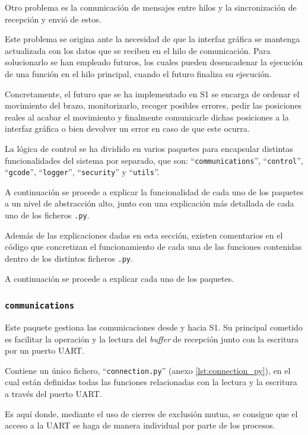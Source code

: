 Otro problema es la comunicación de mensajes entre hilos y la sincronización de recepción y envió de estos. 

Este problema se origina ante la necesidad de que la interfaz gráfica se mantenga actualizada con los datos que se reciben en el hilo de comunicación. Para solucionarlo se han empleado futuros, los cuales pueden desencadenar la ejecución de una función en el hilo principal, cuando el futuro finaliza su ejecución.

Concretamente, el futuro que se ha implementado en \ac{S1} se encarga de ordenar el movimiento del brazo, monitorizarlo, recoger posibles errores, pedir las posiciones reales al acabar el movimiento y finalmente comunicarle dichas posiciones a la interfaz gráfica o bien devolver un error en caso de que este ocurra.

La lógica de control se ha dividido en varios paquetes para encapsular distintas funcionalidades del sistema por separado, que son: ``\texttt{communications}'', ``\texttt{control}'', ``\texttt{gcode}'', ``\texttt{logger}'', ``\texttt{security}'' y ``\texttt{utils}''.

A continuación se procede a explicar la funcionalidad de cada uno de los paquetes a un nivel de abstracción alto, junto con una explicación más detallada de cada uno de los ficheros \texttt{.py}.

Además de las explicaciones dadas en esta sección, existen comentarios en el código que concretizan el funcionamiento de cada una de las funciones contenidas dentro de los distintos ficheros \texttt{.py}.

A continuación se procede a explicar cada uno de los paquetes.

\subsubsection{\texttt{communications}}
Este paquete gestiona las comunicaciones desde y hacia \ac{S1}. Su principal cometido es facilitar la operación y la lectura del \textit{buffer} de recepción junto con la escritura por un puerto UART.

Contiene un único fichero, ``\texttt{connection.py}'' (anexo \ref{lst:connection_py}), en el cual están definidas todas las funciones relacionadas con la lectura y la escritura a través del puerto UART.

Es aquí donde, mediante el uso de cierres de exclusión mutua, se consigue que el acceso a la UART se haga de manera individual por parte de los procesos.

